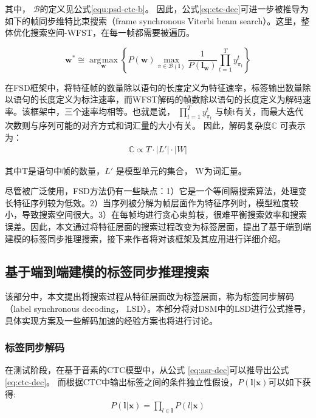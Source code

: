 其中， $\mathcal{B}$的定义见公式\ref{equ:psd-ctc-b}。
因此，公式\ref{eq:ctc-dec}可进一步被推导为如下的帧同步维特比束搜索（frame synchronous Viterbi beam search）。这里，整体优化搜索空间-WFST，在每一帧都需要被遍历。

              
    \begin{equation} \label{eq:viterbi-app}
       \mathbf{w}^* \cong\mathop{\arg\!\max}\limits_\mathbf{w}
       \left\{\!
       P(\mathbf{w})
       \mathop{\max}\limits
       _{\!\!\pi\in\mathcal{B}(\mathbf{l})}
       \frac{1}{P(\mathbf{l}_\mathbf{w})}
       \prod_{t=1}^{T}{y^{t}_{\pi_{t}}}
      \right \}
    \end{equation}

  
在FSD框架中，将特征帧的数量除以语句的长度定义为特征速率，标签输出数量除以语句的长度定义为标注速率，而WFST解码的帧数除以语句的长度定义为解码速率。该框架中，三个速率均相等。也就是说， $\prod_{t=1}^{T} y^{t}_{\pi_{t}}$  与帧t有关，而最大迭代次数则与序列可能的对齐方式和词汇量的大小有关。 因此，解码复杂度$\mathbb{C}$ 可表示为：
  \begin{equation}
\label{equ:complex-fsd}
\begin{split}
\mathbb{C} \propto T\cdot|L'| \cdot|W|
\end{split}
\end{equation}

其中T是语句中帧的数量，$L'$ 是模型单元的集合，
W为词汇量。

尽管被广泛使用，FSD方法仍有一些缺点：1）它是一个等间隔搜索算法，处理变长特征序列较为低效。2）当序列被分解为帧层面作为特征序列时，模型粒度较小，导致搜索空间很大。3）在每帧均进行贪心束剪枝，很难平衡搜索效率和搜索误差。因此，本文通过将特征层面的搜索过程改变为标签层面，提出了基于端到端建模的标签同步推理搜索，接下来作者将对该框架及其应用进行详细介绍。


\subsection{基于端到端建模的标签同步推理搜索}
\label{chap:lsd-lsd-ctc}

该部分中，本文提出将搜索过程从特征层面改为标签层面，称为标签同步解码（label synchronous decoding， LSD）。本部分将对DSM中的LSD进行公式推导，具体实现方案及一些解码加速的经验方案也将进行讨论。

\subsubsection{标签同步解码}
\label{chap:lsd-lsd-ctc-method}
在测试阶段，在基于音素的CTC模型中，从公式 \ref{eq:asr-dec}可以推导出公式\ref{eq:ctc-dec}。 而根据CTC中输出标签之间的条件独立性假设，$P(\mathbf{l}|\mathbf{x})$可以如下获得:
\begin{equation} \label{eq:indep-output-ctc}
  \begin{split}
        P(\mathbf{l}|\mathbf{x}) 
        = \prod_{l\in\mathbf{l}} P(l|\mathbf{x}) \end{split}
       \end{equation}

